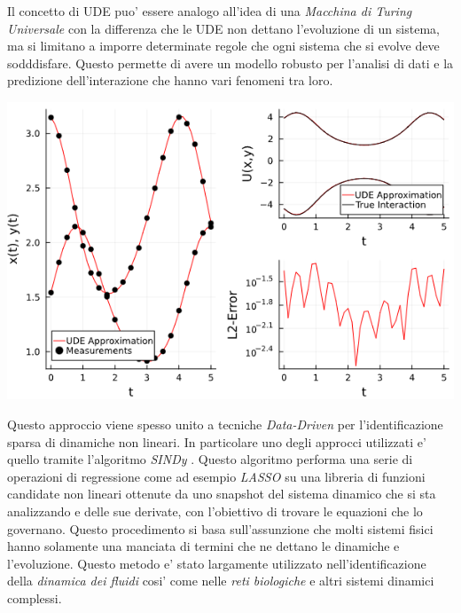 Il concetto di UDE puo' essere analogo all'idea di una \emph{Macchina di Turing Universale}
\cite{wiki:Universal_Turing_machine} con la differenza che le UDE non dettano 
l'evoluzione di un sistema, ma si limitano a imporre determinate regole che 
ogni sistema che si evolve deve sodddisfare. Questo permette di avere un modello robusto 
per l'analisi di dati e la predizione dell'interazione che hanno vari fenomeni tra loro.

\begin{minipage}{\linewidth}
    \centering
    \includegraphics[scale=0.7]{img/ude_approx.png}
    \label{fig:UDE_approx}
\end{minipage}

Questo approccio viene spesso unito a tecniche \emph{Data-Driven} \cite{datadrivendiffeq} per l'identificazione
sparsa di dinamiche non lineari. In particolare uno degli approcci utilizzati 
e' quello tramite l'algoritmo \emph{SINDy} \cite{wiki:Sparse_identification_of_non-linear_dynamics}. 
Questo algoritmo performa una serie di operazioni di regressione come 
ad esempio \emph{LASSO} su una libreria di funzioni candidate non lineari ottenute
da uno snapshot del sistema dinamico che si sta analizzando e delle sue derivate, 
con l'obiettivo di trovare le equazioni che lo governano. Questo procedimento 
si basa sull'assunzione che molti sistemi fisici hanno solamente una manciata di 
termini che ne dettano le dinamiche e l'evoluzione. Questo metodo e' stato largamente
utilizzato nell'identificazione della \emph{dinamica dei fluidi} cosi' come
nelle \emph{reti biologiche} e altri sistemi dinamici complessi.

